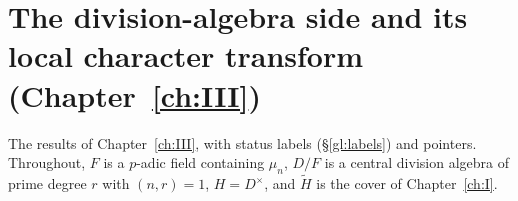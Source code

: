 \providecommand{\tH}{}\renewcommand{\tH}{\widetilde H}
\providecommand{\tZ}{}\renewcommand{\tZ}{\widetilde Z}
\providecommand{\ttT}{}\renewcommand{\ttT}{\widetilde T}
\providecommand{\reg}{}\renewcommand{\reg}{\mathrm{reg}}
\providecommand{\gen}{}\renewcommand{\gen}{\mathrm{gen}}
\providecommand{\JL}{}\renewcommand{\JL}{\mathrm{JL}}
\providecommand{\Sha}{}\renewcommand{\Sha}{\operatorname{Sha}}
\providecommand{\Gb}{}\renewcommand{\Gb}{\overline{G}}
\providecommand{\GDb}{}\renewcommand{\GDb}{\overline{G}_D}
\providecommand{\Zb}{}\renewcommand{\Zb}{\overline{Z}}
\providecommand{\Ptag}{}\renewcommand{\Ptag}{\textnormal{\textbf{(P)}}}
\providecommand{\Etag}{}\renewcommand{\Etag}{\textnormal{\textbf{(E)}}}
\providecommand{\Otag}{}\renewcommand{\Otag}{\textnormal{\textbf{(O)}}}
\providecommand{\Ctag}{}\renewcommand{\Ctag}{\textnormal{\textbf{(C)}}}
\section{\texorpdfstring{The division-algebra side and its local character transform (Chapter~\ref{ch:III})}{The division-algebra side and its local character transform (Chapter 6)}}\label{III:sec:summary}
The results of Chapter~\ref{ch:III}, with status labels (\S\ref{gl:labels}) and pointers. Throughout, $F$ is a $p$-adic field containing $\mu_n$, $D/F$ is a central division algebra of prime degree $r$ with $(n,r)=1$, $H=D^\times$, and $\tH$ is the cover of Chapter~\ref{ch:I}.

